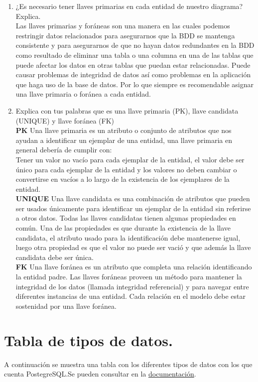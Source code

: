 \documentclass[11pt]{article}
\begin{document}
\begin{enumerate}
    \item ¿Es necesario tener llaves primarias en cada entidad de nuestro diagrama? Explica.\\
    Las llaves primarias y foráneas son una manera en las cuales podemos restringir datos relacionados para asegurarnos que la BDD se mantenga consistente y para asegurarnos de que no hayan datos redundantes en la BDD como resultado de eliminar una tabla o una columna en una de las tablas que puede afectar los datos en otras tablas que puedan estar relacionadas. Puede causar problemas de integridad de datos así como problemas en la aplicación que haga uso de la base de datos. Por lo que siempre es recomendable asignar una llave primaria o foránea a cada entidad.
    
    \item Explica con tus palabras que es una llave primaria (PK), llave candidata (UNIQUE) y llave foránea (FK)\\
    \textbf{PK} Una llave primaria es un atributo o conjunto de atributos que nos ayudan a identificar un ejemplar de una entidad, una llave primaria en general debería de cumplir con:\\
    Tener un valor no vacío para cada ejemplar de la entidad, el valor debe ser único para cada ejemplar de la entidad y los valores no deben cambiar o convertirse en vacíos a lo largo de la existencia de los ejemplares de la entidad.\\
    \textbf{UNIQUE} Una llave candidata es una combinación de atributos que pueden ser usados únicamente para identificar un ejemplar de la entidad sin referirse a otros datos. Todas las llaves candidatas tienen algunas propiedades en común. Una de las propiedades es que durante la existencia de la llave candidata, el atributo usado para la identificación debe mantenerse igual, luego otra propiedad es que el valor no puede ser vació y que además la llave candidata debe ser única.\\
    \textbf{FK} Una llave foránea es un atributo que completa una relación identificando la entidad padre. Las llaves foráneas proveen un método para mantener la integridad de los datos (llamada integridad referencial) y para navegar entre diferentes instancias de una entidad. Cada relación en el modelo debe estar sostenidad por una llave foránea.
\end{enumerate}

\section*{Tabla de tipos de datos.}
A continuación se muestra una tabla con los diferentes tipos de datos con los que cuenta PostegreSQL.Se pueden consultar en la \href{https://www.postgresql.org/docs/9.2/datatype.html}{documentación}.
\end{document}
